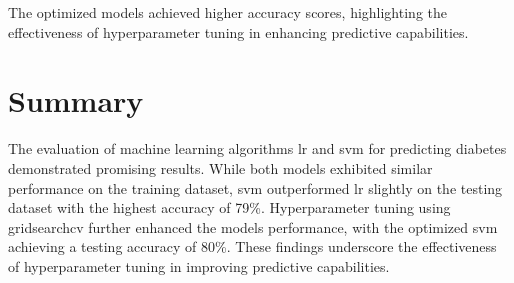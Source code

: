 The optimized models achieved higher accuracy scores, highlighting the effectiveness of hyperparameter tuning in enhancing predictive capabilities.

\section{Summary}
The evaluation of machine learning algorithms lr and svm for predicting diabetes demonstrated promising results. While both models exhibited similar performance on the training dataset, svm outperformed lr slightly on the testing dataset with the highest accuracy of 79\%. Hyperparameter tuning using gridsearchcv further enhanced the models performance, with the optimized svm achieving a testing accuracy of 80\%. These findings underscore the effectiveness of hyperparameter tuning in improving predictive capabilities.



